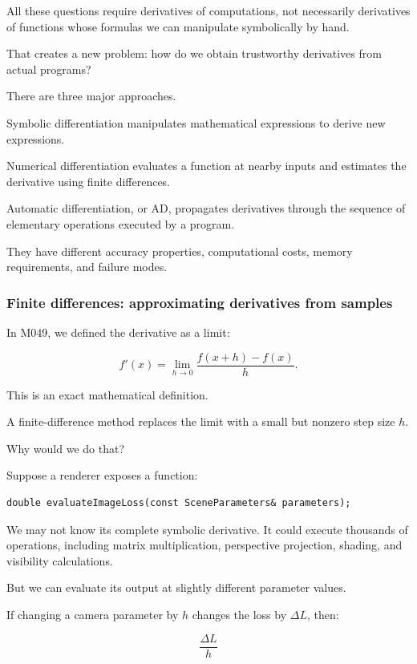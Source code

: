 All these questions require derivatives of computations, not necessarily derivatives of functions whose formulas we can manipulate symbolically by hand.

That creates a new problem: how do we obtain trustworthy derivatives from actual programs?

There are three major approaches.

Symbolic differentiation manipulates mathematical expressions to derive new expressions.

Numerical differentiation evaluates a function at nearby inputs and estimates the derivative using finite differences.

Automatic differentiation, or AD, propagates derivatives through the sequence of elementary operations executed by a program.

They have different accuracy properties, computational costs, memory requirements, and failure modes.

\subsubsection{Finite differences: approximating derivatives from samples}\label{02-foundations-ii-ch025-finite-differences-approximating-derivatives-from-samples}

In M049, we defined the derivative as a limit:

\[
f'(x)= \lim_{h\to0} \frac{f(x+h)-f(x)}h.
\]

This is an exact mathematical definition.

A finite-difference method replaces the limit with a small but nonzero step size \(h\).

Why would we do that?

Suppose a renderer exposes a function:

\begin{verbatim}
double evaluateImageLoss(const SceneParameters& parameters);
\end{verbatim}

We may not know its complete symbolic derivative. It could execute thousands of operations, including matrix multiplication, perspective projection, shading, and visibility calculations.

But we can evaluate its output at slightly different parameter values.

If changing a camera parameter by \(h\) changes the loss by \(\Delta L\), then:

\[
\frac{\Delta L}{h}
\]


